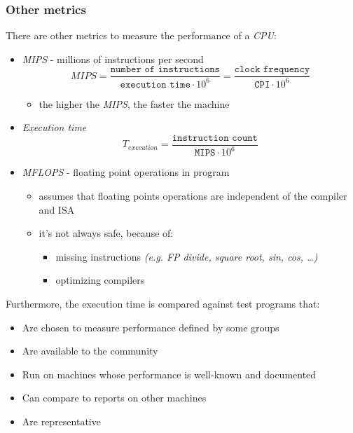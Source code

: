\documentclass[english]{article}
\begin{document}
\subsubsection{Other metrics}

There are other metrics to measure the performance of a \textit{CPU}:

\begin{itemize}
  \item \textit{MIPS} - millions of instructions per second
        \[ MIPS = \dfrac{\texttt{number of instructions}}{\texttt{execution time} \cdot 10^6} = \dfrac{\texttt{clock frequency}}{\texttt{CPI} \cdot 10^6} \]
        \begin{itemize}
          \item the higher the \textit{MIPS}, the faster the machine
        \end{itemize}
  \item \textit{Execution time}
        \[ T_{execution} = \dfrac{\texttt{instruction count}}{\texttt{MIPS} \cdot 10^6} \]
  \item \textit{MFLOPS} - floating point operations in program
        \begin{itemize}
          \item assumes that floating points operations are independent of the compiler and ISA
          \item it's not always safe, because of:
                \begin{itemize}
                  \item missing instructions \textit{(e.g. FP divide, square root, sin, cos, \dots)}
                  \item optimizing compilers
                \end{itemize}
        \end{itemize}
\end{itemize}

Furthermore, the execution time is compared against test programs that:

\begin{itemize}
  \item Are chosen to measure performance defined by some groups
  \item Are available to the community
  \item Run on machines whose performance is well-known and documented
  \item Can compare to reports on other machines
  \item Are representative
\end{itemize}
\end{document}
